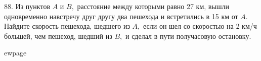 88. Из пунктов $A$ и $B,$ расстояние между которыми равно 27
км, вышли одновременно навстречу друг другу два
пешехода и встретились в 15 км от $A.$ Найдите скорость
пешехода, шедшего из $A,$ если он шел со скоростью на
2 км/ч большей, чем пешеход, шедший из $B,$ и сделал в
пути получасовую остановку.

ewpage
